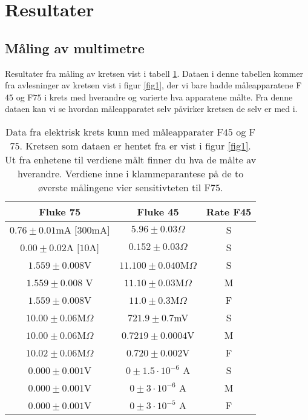 \documentclass[%
 reprint,
nofootinbib,
aps,
]{revtex4-1}
\begin{document}
\section{Resultater}
\subsection{Måling av multimetre}
Resultater fra måling av kretsen vist i tabell \ref{table1}. Dataen i denne tabellen kommer fra avlesninger av kretsen vist i figur \ref{fig1}, der vi bare hadde måleapparatene F$45$ og F$75$ i krets med hverandre og varierte hva apparatene målte. Fra denne dataen kan vi se hvordan måleapparatet selv påvirker kretsen de selv er med i. \\
\begin{table}[h!]
\caption{Data fra elektrisk krets kunn med måleapparater  F$45$ og F$75$. Kretsen som dataen er hentet fra er vist i figur \ref{fig1}. Ut fra enhetene til verdiene målt finner du hva de målte av hverandre. Verdiene inne i klammeparantese på de to øverste målingene vier sensitivteten til F$75$.}\centering
\label{table1}
\begin{tabular}{c c c}
\toprule
Fluke 75                 & Fluke 45                  & Rate F45 \\
\hline
$0.76 \pm  0.01$mA $[300$mA$]$       & $5.96 \pm 0.03 \Omega$ & S           \\
$0.00 \pm 0.02 $A $[10$A$]$       & $0.152 \pm 0.03 \Omega$  & S \\
$1.559 \pm 0.008$V       & $11.100 \pm 0.040 $M$\Omega$    & S        \\
$1.559 \pm 0.008$ V      & $11.10 \pm 0.03$M$\Omega$ & M        \\
$1.559 \pm 0.008$V       & $11.0 \pm 0.3 $M$\Omega$    & F        \\
$10.00 \pm 0.06$M$\Omega$  & $721.9 \pm 0.7 $mV       & S        \\
$10.00 \pm 0.06$M$\Omega$ & $0.7219 \pm 0.0004 $V   & M        \\
$10.02 \pm 0.06$M$\Omega$  & $0.720 \pm0.002$V         & F        \\
$0.000 \pm 0.001$V       & $0 \pm 1.5 \cdot 10^{-6}$ A     & S        \\
$0.000 \pm 0.001$V       & $0  \pm 3 \cdot 10^{-6}$ A      & M        \\
$0.000 \pm 0.001$V       & $0 \pm 3 \cdot 10^{-5}$ A       & F    \\
\end{tabular}
\end{table}
\end{document}
